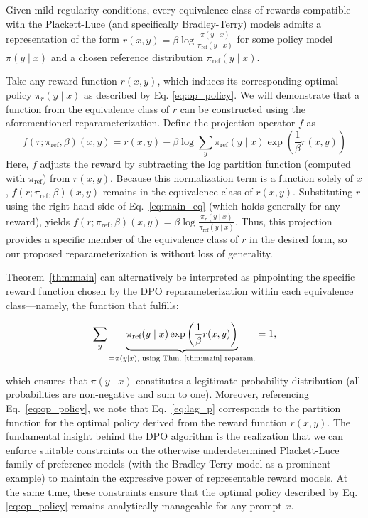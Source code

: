 \begin{theorem}\label{thm:main}
    Given mild regularity conditions, every equivalence class of rewards compatible with the Plackett-Luce (and specifically Bradley-Terry) models admits a representation of the form ${r(x, y) = \beta \log \frac{\pi(y\mid x)}{\pi_\text{ref}(y\mid x)}}$ for some policy model $\pi(y\mid x)$ and a chosen reference distribution $\pi_\text{ref}(y \mid x)$.
\end{theorem}

\begin{sproof}
    Take any reward function $r(x, y)$, which induces its corresponding optimal policy $\pi_r(y \mid x)$ as described by Eq. \ref{eq:op_policy}. We will demonstrate that a function from the equivalence class of $r$ can be constructed using the aforementioned reparameterization. Define the projection operator $f$ as  
\begin{equation}
    f(r; \pi_\text{ref}, \beta)(x, y) = r(x, y) - \beta\log\sum_{y}\pi_\text{ref}(y\mid x)\exp\left(\frac{1}{\beta}r(x, y)\right)
\end{equation}
Here, $f$ adjusts the reward by subtracting the log partition function (computed with $\pi_\text{ref}$) from $r(x, y)$. Because this normalization term is a function solely of $x$, $f(r; \pi_\text{ref}, \beta)(x, y)$ remains in the equivalence class of $r(x, y)$. Substituting $r$ using the right-hand side of Eq.~\ref{eq:main_eq} (which holds generally for any reward), yields $f(r; \pi_\text{ref}, \beta)(x, y) = \beta \log \frac{\pi_r(y\mid x)}{\pi_\text{ref}(y\mid x)}$. Thus, this projection provides a specific member of the equivalence class of $r$ in the desired form, so our proposed reparameterization is without loss of generality.
\end{sproof}

Theorem~\ref{thm:main} can alternatively be interpreted as pinpointing the specific reward function chosen by the DPO reparameterization within each equivalence class—namely, the function that fulfills:

\begin{equation}\label{eq:lag_p}
     \sum_{y}\underbrace{\pi_\text{ref}(y\mid x)\exp\left(\frac{1}{\beta}r(x, y)\right)}_{=\pi(y\mid x)\text{, using Thm.~\ref{thm:main} reparam.}} = 1,
\end{equation}

which ensures that $\pi(y\mid x)$ constitutes a legitimate probability distribution (all probabilities are non-negative and sum to one). Moreover, referencing Eq.~\ref{eq:op_policy}, we note that Eq.~\ref{eq:lag_p} corresponds to the partition function for the optimal policy derived from the reward function $r(x, y)$. The fundamental insight behind the DPO algorithm is the realization that we can enforce suitable constraints on the otherwise underdetermined Plackett-Luce family of preference models (with the Bradley-Terry model as a prominent example) to maintain the expressive power of representable reward models. At the same time, these constraints ensure that the optimal policy described by Eq. \ref{eq:op_policy} remains analytically manageable for any prompt $x$.

